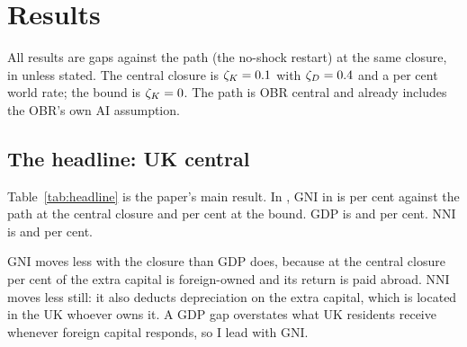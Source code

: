 \section{Results}
\label{sec:results}

All results are gaps against the path (the no-shock restart) at the same closure, in \genHeadYear{} unless stated. The central closure is $\zeta_K = 0.1{}$ with $\zeta_D = 0.4{}$ and a \genWorldRatePct{} per cent world rate; the bound is $\zeta_K = 0{}$. The path is OBR central and already includes the OBR's own AI assumption.

\subsection{The headline: UK central}
\label{sec:results-headline}

Table~\ref{tab:headline} is the paper's main result. In \Main{}, GNI in \genHeadYear{} is \genUkCentralMainGniCentralShort{} per cent against the path at the central closure and \genUkCentralMainGniBoundShort{} per cent at the bound. GDP is \genUkCentralMainGdpCentralShort{} and \genUkCentralMainGdpBoundShort{} per cent. NNI is \genUkCentralMainNniCentralShort{} and \genUkCentralMainNniBoundShort{} per cent.

GNI moves less with the closure than GDP does, because at the central closure \genUkCentralForeignShareExtraKCentral{} per cent of the extra capital is foreign-owned and its return is paid abroad. NNI moves less still: it also deducts depreciation on the extra capital, which is located in the UK whoever owns it. A GDP gap overstates what UK residents receive whenever foreign capital responds, so I lead with GNI.

